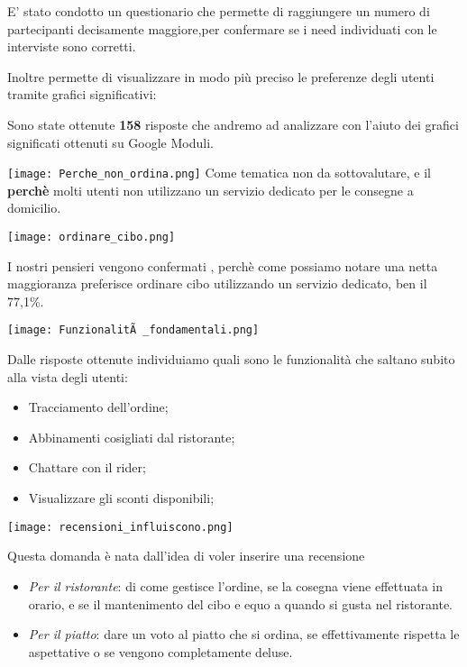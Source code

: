 \documentclass{article}
\begin{document}
     \par 
\par E' stato condotto un questionario che permette di raggiungere un numero di partecipanti decisamente maggiore,per confermare se i need individuati con le interviste sono corretti.\par Inoltre permette di visualizzare in modo più preciso le preferenze degli utenti tramite grafici significativi:
\par \vspace{1cm}
Sono state ottenute \textbf{158} risposte che andremo ad analizzare con l'aiuto dei grafici significati ottenuti su Google Moduli.\par 
\texttt{[image: Perche\_non\_ordina.png]}
Come tematica non da sottovalutare, e il \textbf{perchè} molti utenti non utilizzano un servizio dedicato per le consegne a domicilio.\vspace{1cm}\par
\texttt{[image: ordinare\_cibo.png]}\par
I nostri pensieri vengono confermati , perchè come possiamo notare una netta maggioranza preferisce ordinare cibo utilizzando un servizio dedicato, ben il 77,1\%.\par \vspace{1cm}
\texttt{[image: FunzionalitÃ \_fondamentali.png]}\par
Dalle risposte ottenute individuiamo quali sono le funzionalità che saltano subito alla vista degli utenti:
\par \begin{itemize}
    \item Tracciamento dell'ordine;
    \item Abbinamenti cosigliati dal ristorante;
    \item Chattare con il rider;
    \item Visualizzare gli sconti disponibili;
\end{itemize}   \vspace{1cm} \par
\texttt{[image: recensioni\_influiscono.png]}\par
Questa domanda è nata dall'idea di voler inserire una recensione 
    \begin{itemize}
        \item \textit{Per il ristorante}: di come gestisce l'ordine, se la cosegna viene effettuata in orario, e se il mantenimento del cibo e equo a quando si gusta nel ristorante.
        \item \textit{Per il piatto}: dare un voto al piatto che si ordina, se effettivamente rispetta le aspettative o se vengono completamente deluse.
    \end{itemize}
\end{document}
